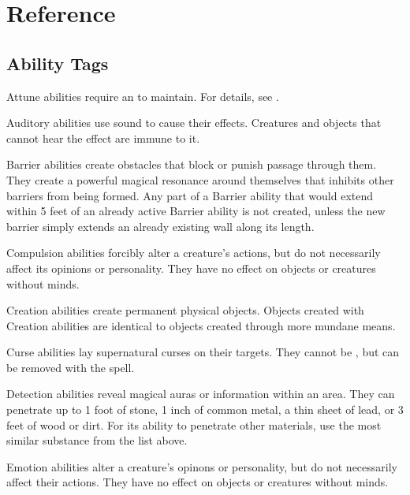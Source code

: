 \chapter{Reference}\label{Reference}

\section{Ability Tags}\label{Ability Tags}

     Attune abilities require an  to maintain.
    For details, see .

     Auditory abilities use sound to cause their effects.
    Creatures and objects that cannot hear the effect are immune to it.

     Barrier abilities create obstacles that block or punish passage through them.
    They create a powerful magical resonance around themselves that inhibits other barriers from being formed.
    Any part of a Barrier ability that would extend within 5 feet of an already active Barrier ability is not created, unless the new barrier simply extends an already existing wall along its length.

     Compulsion abilities forcibly alter a creature's actions, but do not necessarily affect its opinions or personality.
    They have no effect on objects or creatures without minds.

     Creation abilities create permanent physical objects.
    Objects created with Creation abilities are identical to objects created through more mundane means.

     Curse abilities lay supernatural curses on their targets.
    They cannot be , but can be removed with the  spell.

    \label{Detection} Detection abilities reveal magical auras or information within an area.
    They can penetrate up to 1 foot of stone, 1 inch of common metal, a thin sheet of lead, or 3 feet of wood or dirt.
    For its ability to penetrate other materials, use the most similar substance from the list above.

     Emotion abilities alter a creature's opinons or personality, but do not necessarily affect their actions.
    They have no effect on objects or creatures without minds.

